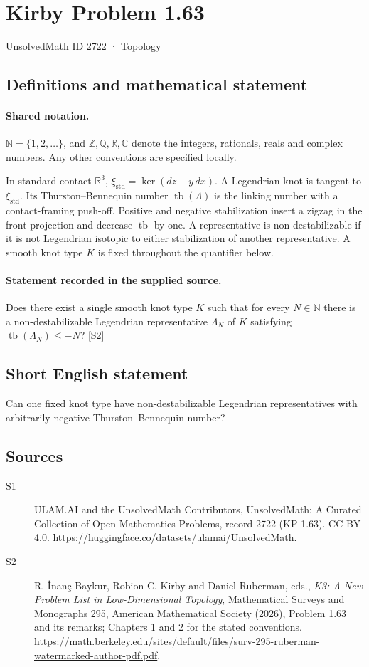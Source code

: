 \documentclass[11pt]{article}
\newcommand{\sref}[2]{\hyperlink{source:#1:#2}{[S#2]}}
\begin{document}
\setcounter{section}{2721}
\section{Kirby Problem 1.63}\label{2722}
{\small\sffamily UnsolvedMath ID 2722 · Topology}
\subsection{Definitions and mathematical statement}

\paragraph{Shared notation.}$\mathbb N=\{1,2,\ldots\}$, and $\mathbb Z,\mathbb Q,\mathbb R,\mathbb C$ denote the integers, rationals, reals and complex numbers. Any other conventions are specified locally.


In standard contact $\mathbb R^3$, $\xi_{\mathrm{std}}=\ker(dz-y\,dx)$. A Legendrian knot is tangent to $\xi_{\mathrm{std}}$. Its Thurston--Bennequin number $\operatorname{tb}(\Lambda)$ is the linking number with a contact-framing push-off. Positive and negative stabilization insert a zigzag in the front projection and decrease $\operatorname{tb}$ by one. A representative is non-destabilizable if it is not Legendrian isotopic to either stabilization of another representative. A smooth knot type $K$ is fixed throughout the quantifier below.
\paragraph{Statement recorded in the supplied source.}
Does there exist a single smooth knot type $K$ such that for every $N\in\mathbb N$ there is a non-destabilizable Legendrian representative $\Lambda_N$ of $K$ satisfying $\operatorname{tb}(\Lambda_N)\le -N$? \sref{2722}{2}

\subsection{Short English statement}
Can one fixed knot type have non-destabilizable Legendrian representatives with arbitrarily negative Thurston--Bennequin number?
\subsection{Sources}
\begin{description}
\item[\hypertarget{source:2722:1}{S1}] ULAM.AI and the UnsolvedMath Contributors, UnsolvedMath: A Curated Collection of Open Mathematics Problems, record 2722 (KP-1.63). CC BY 4.0. \url{https://huggingface.co/datasets/ulamai/UnsolvedMath}.
\item[\hypertarget{source:2722:2}{S2}] R. İnanç Baykur, Robion C. Kirby and Daniel Ruberman, eds., \emph{K3: A New Problem List in Low-Dimensional Topology}, Mathematical Surveys and Monographs 295, American Mathematical Society (2026), Problem 1.63 and its remarks; Chapters 1 and 2 for the stated conventions. \url{https://math.berkeley.edu/sites/default/files/surv-295-ruberman-watermarked-author-pdf.pdf}.
\end{description}
\label{end:2722}
\end{document}
